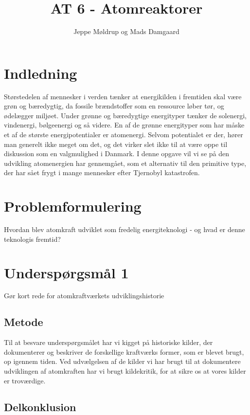 \documentclass{article}
\title{AT 6 - Atomreaktorer}
\author{Jeppe Møldrup og Mads Damgaard}
\begin{document}
\maketitle
\pagebreak
\tableofcontents
\pagebreak

\section{Indledning}

Størstedelen af mennesker i verden tænker at energikilden i fremtiden skal være grøn og bæredygtig, da fossile brændstoffer som en ressource løber tør, og ødelægger miljøet. Under grønne og bæredygtige energityper tænker de solenergi, vindenergi, bølgeenergi og så videre. En af de grønne energityper som har måske et af de største energipotentialer er atomenergi. Selvom potentialet er der, hører man generelt ikke meget om det, og det virker slet ikke til at være oppe til diskussion som en valgmulighed i Danmark. I denne opgave vil vi se på den udvikling atomenergien har gennemgået, som et alternativ til den primitive type, der har sået frygt i mange mennesker efter Tjernobyl katastrofen.

\section{Problemformulering}

Hvordan blev atomkraft udviklet som fredelig energiteknologi  - og hvad er denne teknologis fremtid?

\section{Underspørgsmål 1}

Gør kort rede for atomkraftværkets udviklingshistorie

\subsection{Metode}

Til at besvare underspørgsmålet har vi kigget på historiske kilder, der dokumenterer  og beskriver de forskellige kraftværks former, som er blevet brugt, op igennem tiden. Ved udvælgelsen af de kilder vi har brugt til at dokumentere udviklingen af atomkraften har vi brugt kildekritik, for at sikre os at vores kilder er troværdige.

\subsection{Delkonklusion}
\end{document}
